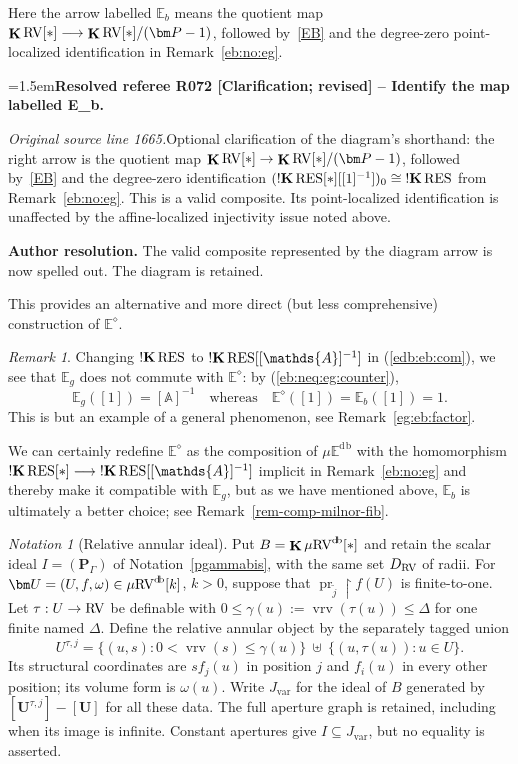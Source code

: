 \documentclass[12pt]{amsart}
\newcommand{\ResolvedRefereeRemark}[5]{%
  \par\medskip\begingroup\normalfont\small\color{gray}%
  \emergencystretch=1.5em\noindent\textbf{Resolved referee R#1 [#2] -- #3.}\par\nobreak\noindent #4\par
  \medskip\color{ResolutionGreen}\noindent\textbf{Author resolution.} #5\par
  \endgroup\medskip
}
\theoremstyle{plain}
\theoremstyle{definition}
\theoremstyle{remark}
\newtheorem{rem}[thm]{Remark}
\newtheorem{nota}[thm]{Notation}
\numberwithin{equation}{section}
\theoremstyle{plain}
\newcommand{\RV}{\textup{RV}}
\DeclareMathOperator{\pr}{pr}
\newcommand{\A}{\mathds{A}}
\newcommand{\0}{\emptyset}
\newcommand{\bb}[1]{\mathbb{#1}}
\newcommand{\rest}{\upharpoonright}
\newcommand{\fun}{\longrightarrow}
\newcommand{\mRV}{{\mu}{\RV}}
\newcommand{\mgRV}{{\mu}{\RV}}
\newcommand{\RES}{\textup{RES}}
\newcommand{\mgE}{{\mu}{\bb E}}
\DeclareMathOperator{\ggk}{\mathbf{K}}
\DeclareMathOperator{\sggk}{!\mathbf{K}}
\DeclareMathOperator{\vrv}{vrv}
\DeclareMathOperator{\db}{d \! b}
\begin{document}
Here the arrow labelled $\bb E_b$ means the quotient map $\ggk\RV[*]\fun\ggk\RV[*]/(\bm P-1)$, followed by~\eqref{EB} and the degree-zero point-localized identification in Remark~\ref{eb:no:eg}.

\ResolvedRefereeRemark{072}{Clarification; revised}{Identify the map labelled E\_b}{%
\textit{Original source line 1665.}\quad Optional clarification of the diagram's shorthand: the right arrow is the quotient map $\ggk\RV[*]\to\ggk\RV[*]/(\bm P-1)$, followed by~\eqref{EB} and the degree-zero identification $(\sggk\RES[*][[1]^{-1}])_0\cong\sggk\RES$ from Remark~\ref{eb:no:eg}. This is a valid composite. Its point-localized identification is unaffected by the affine-localized injectivity issue noted above.
}{The valid composite represented by the diagram arrow is now spelled out. The diagram is retained.}
This provides an alternative and more direct (but less comprehensive) construction of $\bb E^{\diamond}$.

\begin{rem}\label{eb:not:eg}
Changing $\sggk \RES$ to $\sggk \RES[[\A]^{-1}]$ in (\ref{edb:eb:com}), we see that  $\bb E_g$ does not commute with $\bb E^{\diamond}$: by (\ref{eb:neq:eg:counter}),
\[
\bb E_g([1]) = [\A]^{-1} \quad \text{whereas} \quad \bb E^{\diamond}([1]) = \bb E_b([1]) = 1.
\]
This is but an example of a general phenomenon, see Remark~\ref{eg:eb:factor}.


We can certainly redefine $\bb E^{\diamond}$ as the composition of $\mgE^{\db}$ with  the homomorphism $\sggk \RES[*] \fun \sggk \RES[[\A]^{-1}]$ implicit in Remark~\ref{eb:no:eg} and thereby make it compatible with $\bb E_g$, but as we have mentioned above, $\bb E_b$ is ultimately a better choice; see Remark~\ref{rem-comp-milnor-fib}.
\end{rem}


\begin{nota}[Relative annular ideal]\label{relative:annular:ideal}
Put $B=\ggk\mgRV^{\db}[*]$ and retain the scalar ideal
$I=(\bm P_\Gamma)$ of Notation~\ref{pgammabis}, with the same set
$D_{\RV}$ of radii. For
$\bm U=(U,f,\omega)\in\mRV^{\db}[k]$, $k>0$, suppose that
$\pr_{\widetilde j}\rest f(U)$ is finite-to-one. Let
$\tau:U\to\RV$ be definable with
$0\leq\gamma(u):=\vrv(\tau(u))\leq\Delta$ for one finite named
$\Delta$. Define the relative annular object by the separately tagged
union
\[
 U^{\tau,j}=\{(u,s):0<\vrv(s)\leq\gamma(u)\}
 \ \uplus\ \{(u,\tau(u)):u\in U\}.
\]
Its structural coordinates are $sf_j(u)$ in position $j$ and $f_i(u)$
in every other position; its volume form is $\omega(u)$.
Write $J_{\mathrm{var}}$ for the ideal of $B$ generated by
$[\bm U^{\tau,j}]-[\bm U]$ for all these data. The full aperture graph
is retained, including when its image is infinite. Constant apertures
give $I\subseteq J_{\mathrm{var}}$, but no equality is asserted.
\end{nota}
\end{document}
